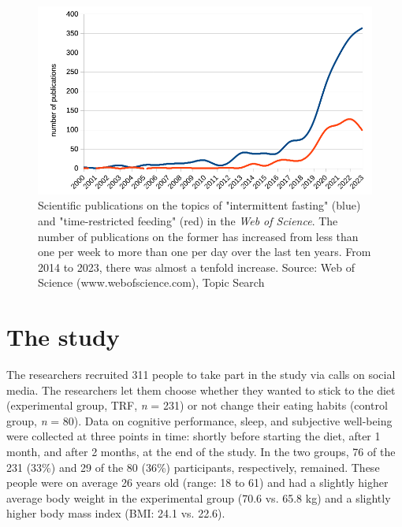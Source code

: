 \documentclass[authordate, reflection,issue]{jote-new-article}
\begin{document}
\begin{figure}[t!]

  \begin{fullwidth}
    \includegraphics[width=\linewidth]{media/image2.png}
    \caption{Scientific publications on the topics of "intermittent fasting" (blue) and "time-restricted feeding" (red) in the \emph{Web of Science}. The number of publications on the former has increased from less than one per week to more than one per day over the last ten years. From 2014 to 2023, there was almost a tenfold increase. Source: Web of Science (www.webofscience.com), Topic Search}
  \end{fullwidth}
\end{figure}




\section{The study}






The researchers recruited 311 people to take part in the study via calls on social media. The researchers let them choose whether they wanted to stick to the diet (experimental group, TRF, \emph{n }= 231) or not change their eating habits (control group, \emph{n }= 80). Data on cognitive performance, sleep, and subjective well-being were collected at three points in time: shortly before starting the diet, after 1 month, and after 2 months, at the end of the study. In the two groups, 76 of the 231 (33\%) and 29 of the 80 (36\%) participants, respectively, remained. These people were on average 26 years old (range: 18 to 61) and had a slightly higher average body weight in the experimental group (70.6 vs. 65.8 kg) and a slightly higher body mass index (BMI: 24.1 vs. 22.6).
\end{document}
